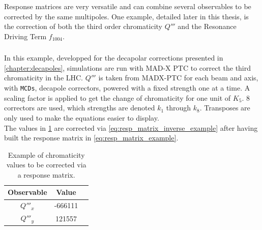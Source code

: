 Response matrices are very versatile and can combine several observables to be corrected by the same
multipoles. One example, detailed later in this thesis, is the correction of both the third order
chromaticity $Q'''$ and the Resonance Driving Term $f_{1004}$.

\subsubsection{}

In this example, developped for the decapolar corrections presented in \cref{chapter:decapoles},
simulations are run with MAD-X PTC to correct the third chromaticity in the LHC.  $Q'''$ is taken
from MADX-PTC for each beam and axis, with \verb|MCDs|, decapole correctors, powered with a
fixed strength one at a time. A scaling factor is applied to get the change of chromaticity for one
unit of $K_5$.  8 correctors are used, which strengths are denoted $k_1$ through $k_8$. Transposes
are only used to make the equations easier to display.\\
The values in \cref{table:resp_matrix_example} are corrected via
\cref{eq:resp_matrix_inverse_example} after having built the response matrix in
\cref{eq:resp_matrix_example}.

\begin{table}[H]
  \center
  \begin{tabular}{ccc}
    \toprule
      Observable & Value \\
    \midrule
      $Q'''_x$ & -666111 \\
      $Q'''_y$ &  121557 \\
    \bottomrule
  \end{tabular}
  \caption{Example of chromaticity values to be corrected via a response matrix.}
  \label{table:resp_matrix_example}
\end{table}

